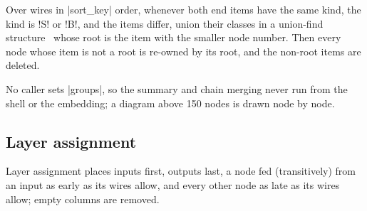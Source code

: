 \begin{algorithm}\label{alg:pictorial-chains}
Over wires in \py|sort_key| order, whenever both end items have the same kind, the kind is
\code!S! or \code!B!, and the items differ, union their classes in a union-find
structure~\cite{tarjan1975unionfind} whose root is the item with the smaller node number. Then
every node whose item is not a root is re-owned by its root, and the non-root items are deleted.
\end{algorithm}

No caller sets \py|groups|, so the summary and chain merging never run from the shell or the
embedding; a diagram above 150 nodes is drawn node by node.

\subsection{Layer assignment}\label{sec:pictorial-layer}

Layer assignment places inputs first, outputs last, a node fed (transitively) from an input as
early as its wires allow, and every other node as late as its wires allow; empty columns are
removed.

